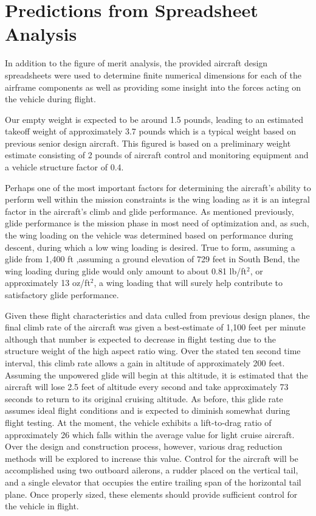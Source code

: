 \documentclass[titlepage]{article}
\begin{document}
\section{Predictions from Spreadsheet Analysis}
In addition to the figure of merit analysis, the provided aircraft design spreadsheets were used to determine finite numerical dimensions for each of the airframe components as well as providing some insight into the forces acting on the vehicle during flight. 

Our empty weight is expected to be around 1.5 pounds, leading to an estimated takeoff weight of approximately 3.7 pounds which is a typical weight based on previous senior design aircraft. This figured is based on a preliminary weight estimate consisting of 2 pounds of aircraft control and monitoring equipment and a vehicle structure factor of 0.4.

Perhaps one of the most important factors for determining the aircraft's ability to perform well within the mission constraints is the wing loading as it is an integral factor in the aircraft's climb and glide performance. As mentioned previously, glide performance is the mission phase in most need of optimization and, as such, the wing loading on the vehicle was determined based on performance during descent, during which a low wing loading is desired. True to form, assuming a glide from 1,400 ft ,assuming a ground elevation of 729 feet in South Bend, the wing loading during glide would only amount to about 0.81 lb/ft$^2$, or approximately 13 oz/ft$^2$, a wing loading that will surely help contribute to satisfactory glide performance.

Given these flight characteristics and data culled from previous design planes, the final climb rate of the aircraft was given a best-estimate of 1,100 feet per minute although that number is expected to decrease in flight testing due to the structure weight of the high aspect ratio wing. Over the stated ten second time interval, this climb rate allows a gain in altitude of approximately 200 feet. Assuming the unpowered glide will begin at this altitude, it is estimated that the aircraft will lose 2.5 feet of altitude every second and take approximately 73 seconds to return to its original cruising altitude. As before, this glide rate assumes ideal flight conditions and is expected to diminish somewhat during flight testing.
At the moment, the vehicle exhibits a lift-to-drag ratio of approximately 26 which falls within the average value for light cruise aircraft. Over the design and construction process, however, various drag reduction methods will be explored to increase this value. Control for the aircraft will be accomplished using two outboard ailerons, a rudder placed on the vertical tail, and a single elevator that occupies the entire trailing span of the horizontal tail plane. Once properly sized, these elements should provide sufficient control for the vehicle in flight.
\end{document}
